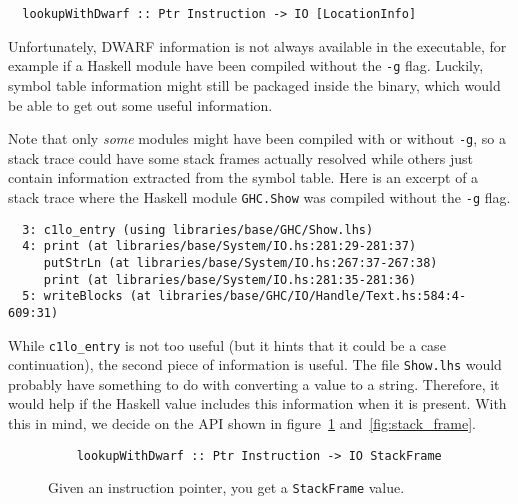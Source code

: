 \begin{verbatim}
  lookupWithDwarf :: Ptr Instruction -> IO [LocationInfo]
\end{verbatim}

Unfortunately, DWARF information is not always available in the
executable, for example if a Haskell module have been compiled without
the
\texttt{-g} flag. Luckily, symbol table information might still be
packaged inside the binary, which would be able to get out some useful
information.

Note that only \emph{some} modules might have been compiled
with or without \texttt{-g}, so a stack trace could have some stack frames actually
resolved while others just contain information extracted from the symbol
table. Here is an excerpt of a stack trace where the Haskell module \texttt{GHC.Show}
was compiled without the \texttt{-g} flag.

\begin{verbatim}
  3: c1lo_entry (using libraries/base/GHC/Show.lhs)
  4: print (at libraries/base/System/IO.hs:281:29-281:37)
     putStrLn (at libraries/base/System/IO.hs:267:37-267:38)
     print (at libraries/base/System/IO.hs:281:35-281:36)
  5: writeBlocks (at libraries/base/GHC/IO/Handle/Text.hs:584:4-609:31)
\end{verbatim}

%

While \texttt{c1lo\_entry} is not too useful (but it hints that it
could be a case continuation), the second piece of information is
useful. The file \texttt{Show.lhs} would probably have something to do
with converting a value to a string. Therefore, it would help if the
Haskell value includes this information when it is present. With this
in mind, we decide on the API shown in figure~\ref{fig:lookup_with_dwarf}
and~\ref{fig:stack_frame}.

\begin{figure}
\begin{mdframed}
  \begin{verbatim}
    lookupWithDwarf :: Ptr Instruction -> IO StackFrame
  \end{verbatim}
  \caption{Given an instruction pointer, you get a \texttt{StackFrame} value.}
  \label{fig:lookup_with_dwarf}
\end{mdframed}
\end{figure}

